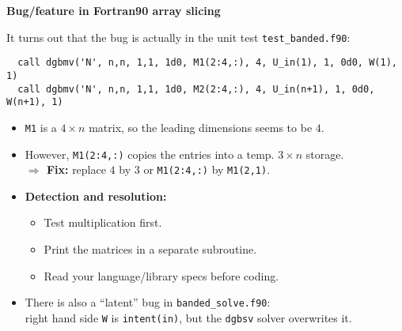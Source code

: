 \documentclass{slides}
\begin{document}
\begin{center}
{\large\bf Bug/feature in Fortran90 array slicing}
\end{center}

It turns out that the bug is actually in the unit test \verb+test_banded.f90+:

\begin{verbatim}
  call dgbmv('N', n,n, 1,1, 1d0, M1(2:4,:), 4, U_in(1), 1, 0d0, W(1), 1)
  call dgbmv('N', n,n, 1,1, 1d0, M2(2:4,:), 4, U_in(n+1), 1, 0d0, W(n+1), 1)
\end{verbatim}


\vspace*{-3.5ex}

\begin{itemize}
 \item \verb+M1+ is a $4 \times n$ matrix, so the leading dimensions seems to be $4$.
 \vspace*{-2ex}
 \item However, \verb+M1(2:4,:)+ copies the entries into a temp. $3 \times n$ storage. \\
 \hspace*{1cm} \textbf{$\Rightarrow$ Fix:} replace $4$ by $3$ or \verb+M1(2:4,:)+ by \verb+M1(2,1)+.
 \vspace*{-2.5ex}
 \item \textbf{Detection and resolution:}
  \begin{itemize}
  \vspace*{-2ex}
   \item Test multiplication first.
   \vspace*{-2ex}
   \item Print the matrices in a separate subroutine.
   \vspace*{-2ex}
   \item Read your language/library specs before coding.
  \end{itemize}
 \vspace*{0.5ex}
 \item There is also a ``latent'' bug in \verb+banded_solve.f90+: \\
 right hand side \verb+W+ is \verb+intent(in)+, but the \verb+dgbsv+ solver overwrites it.
\end{itemize}
\end{document}
